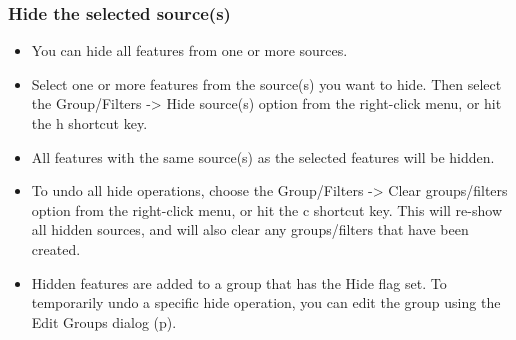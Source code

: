 \documentclass[letterpaper]{article}
\newcommand\liststyleWWviiiNumxvi{%
\renewcommand\labelitemi{{\textbullet}}
\renewcommand\labelitemii{o}
\renewcommand\labelitemiii{[F0A7?]}
\renewcommand\labelitemiv{[F0B7?]}
}
\begin{document}
{\color[rgb]{0.30980393,0.5058824,0.7411765}
\subsubsection[Hide the selected source(s)]{Hide the selected source(s)}}
\hypertarget{RefHeading2121056909880}{}\liststyleWWviiiNumxvi
\begin{itemize}
\item {You can hide all features from one or more sources.}
\item {Select one or more features from the source(s) you want to hide. Then select the {\textquotesingle}Group/Filters -> Hide source(s){\textquotesingle} option from the right-click menu, or hit the {\textquotesingle}h{\textquotesingle} shortcut key.}
\item {All features with the same source(s) as the selected features will be hidden.}
\item {To undo all hide operations, choose the {\textquotesingle}Group/Filters -> Clear groups/filters{\textquotesingle} option from the right-click menu, or hit the {\textquotesingle}c{\textquotesingle} shortcut key. This will re-show all hidden sources, and will also clear any groups/filters that have been created.}
\item {Hidden features are added to a group that has the Hide flag set. To temporarily undo a specific hide operation, you can edit the group using the Edit Groups dialog (p\pageref{section:edit_group}).}
\end{itemize}
\end{document}
